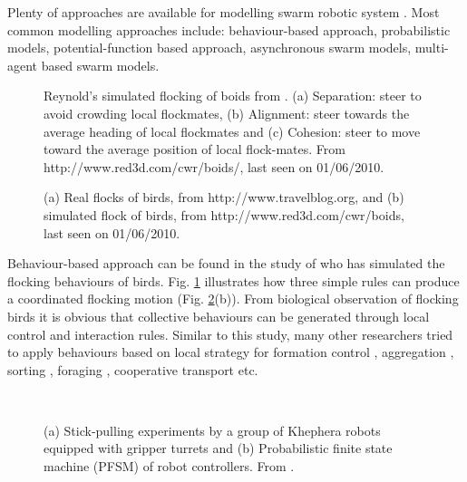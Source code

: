 Plenty of approaches are available for modelling swarm robotic system \cite{Gazi+2006}. Most common modelling approaches include: behaviour-based approach, probabilistic models, potential-function based approach, asynchronous swarm models, multi-agent based swarm models.
\begin{figure}[H]
\centering
{} 
\hspace{0.25cm}
\hspace{0.25cm}
\caption{ Reynold's simulated flocking of boids from \protect{}. (a) Separation: steer to avoid crowding local flockmates, (b) Alignment: steer towards the average heading of local flockmates and (c) Cohesion: steer to move toward the average position of local flock-mates. \protect\newline  From http://www.red3d.com/cwr/boids/, last seen on 01/06/2010.}
\label{fig:boid-rules}
\end{figure}
\begin{figure}[H]
\centering
{} 
\hspace{0.25cm}
\caption{ (a) Real flocks of birds, from http://www.travelblog.org, and (b) simulated flock of birds, from http://www.red3d.com/cwr/boids, last seen on 01/06/2010.}
\label{fig:flocking-birds}
\end{figure}%

Behaviour-based approach can be found in the study of  who has simulated the flocking behaviours of birds. Fig. \ref{fig:boid-rules} illustrates how three simple rules can produce a coordinated flocking motion (Fig. \ref{fig:flocking-birds}(b)). From biological observation of flocking birds  it is obvious that collective behaviours can be generated through local control and interaction rules. Similar to this study, many other researchers tried to apply behaviours based on local strategy for formation control \cite{Balch+1998}, aggregation \cite{Mataric1995}, sorting \cite{Melhuish+1998}, foraging \cite{Liu+2007}, cooperative transport \cite{Kube1997} etc.
\begin{figure}[H]
\centering
{} 
\hspace{0.5cm}\\
\caption{ (a) Stick-pulling experiments by a group of Khephera robots equipped with gripper turrets and (b) Probabilistic finite state machine (PFSM) of robot controllers. From \protect{}.}
\label{fig:stick-pulling-expt}
\end{figure}

